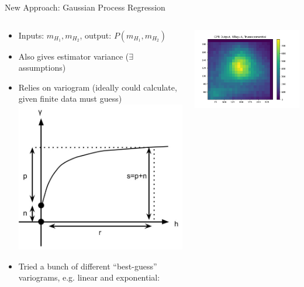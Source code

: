\documentclass[10pt, aspectratio=169]{beamer}
\begin{document}
\begin{frame}{New Approach: Gaussian Process Regression}
  \begin{columns}[onlytextwidth]
    \begin{column}{0.6\textwidth}
      \begin{itemize}
        \item Inputs: $m_{H_1}, m_{H_2}$, output: $P(m_{H_1}, m_{H_2})$ 
        \item Also gives estimator variance ($\exists$ assumptions)
        \item Relies on \alert{variogram}
              (ideally could calculate, given finite data must guess)
        \includegraphics[width=0.5\linewidth]{images/variogram_variables.jpg}\\
        \item Tried a bunch of different ``best-guess'' variograms, e.g. linear and exponential:
      \end{itemize}
    \end{column}
    \begin{column}{0.4\textwidth}
      \phantom{aaaaaa}
      \includegraphics[width=0.8\linewidth, trim=0 0 4cm 1.5cm, clip]{images/kriging_Trueexponential_4b.png}\\

\end{column}
\end{columns}
\end{frame}
\end{document}
